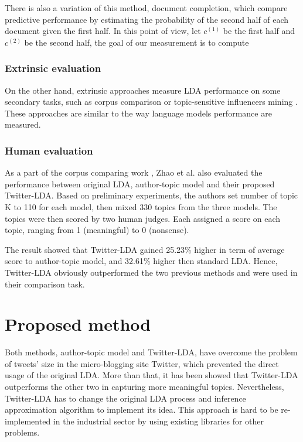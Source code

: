 \documentclass[11pt]{article}
\begin{document}
There is also a variation of this method, document completion, which compare predictive performance by estimating the probability of the second half of each document given the first half. In this point of view, let $c^{(1)}$ be the first half and $c^{(2)}$ be the second half, the goal of our measurement is to compute

\subsubsection{Extrinsic evaluation}
On the other hand, extrinsic approaches measure LDA performance on some secondary tasks, such as corpus comparison \cite{zhao2011comparing} or topic-sensitive influencers mining \cite{Weng2010}. These approaches are similar to the way language models performance are measured.

\subsubsection{Human evaluation}

As a part of the corpus comparing work \cite{zhao2011comparing}, Zhao et al. also evaluated the performance between original LDA, author-topic model and their proposed Twitter-LDA. Based on preliminary experiments, the authors set number of topic K to 110 for each model, then mixed 330 topics from the three models. The topics were then scored by two human judges. Each assigned a score on each topic, ranging from 1 (meaningful) to 0 (nonsense).

The result showed that Twitter-LDA gained 25.23\% higher in term of average score to author-topic model, and 32.61\% higher then standard LDA. Hence, Twitter-LDA obviously outperformed the two previous methods and were used in their comparison task.


\section{Proposed method} \label{proposal}

Both methods, author-topic model and Twitter-LDA, have overcome the problem of tweets' size in the micro-blogging site Twitter, which prevented the direct usage of the original LDA. More than that, it has been showed that Twitter-LDA outperforms the other two in capturing more meaningful topics. Nevertheless, Twitter-LDA has to change the original LDA process and inference approximation algorithm to implement its idea. This approach is hard to be re-implemented in the industrial sector by using existing libraries for other problems.
\end{document}
